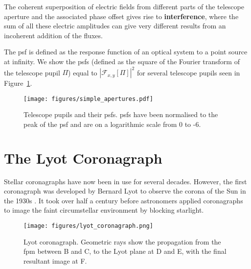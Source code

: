\documentclass[letterpaper]{ar-1col}
\begin{document}


The coherent superposition of electric fields from different parts of the telescope aperture and the associated phase offset gives rise to \textbf{interference}, where the sum of all these electric amplitudes can give very different results from an incoherent addition of the fluxes.

The \ac{psf} is defined as the response function of an optical system to a point source at infinity.
%
We show the \acp{psf} (defined as the square of the Fourier transform of the telescope pupil $\Pi$) equal to $|\mathcal{F}_{x,y}[\Pi]|^2$ for several telescope pupils seen in Figure~\ref{fig:simple_apertures}.

\begin{figure}[ht]
  \centering
  \texttt{[image: figures/simple\_apertures.pdf]}
  \caption{Telescope pupils and their \acp{psf}. 
  \acp{psf} have been normalised to the peak of the \ac{psf} and are on a logarithmic scale from 0 to -6.}
  \label{fig:simple_apertures}
\end{figure}


\section{The Lyot Coronagraph}

Stellar coronagraphs have now been in use for several decades.
%
However, the first coronagraph was developed by Bernard Lyot to observe the corona of the Sun in the 1930s \citep{Lyot39}.
%
It took over half a century before astronomers applied coronagraphs to image the faint circumstellar environment by blocking starlight. 

\begin{figure}[ht]
  \centering
  \texttt{[image: figures/lyot\_coronagraph.png]}
  \caption{Lyot coronagraph.
  Geometric rays show the propagation from the \ac{fpm} between B and C, to the Lyot plane at D and E, with the final resultant image at F.}
  \label{fig:lyot}
\end{figure}
\end{document}
